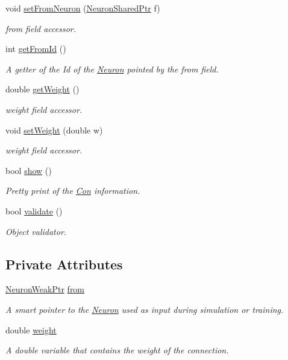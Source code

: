 \begin{DoxyCompactItemize}
void \hyperlink{class_con_a88d665801c38f923b61091f2b4d4c571}{setFromNeuron} (\hyperlink{_a_m_o_r_e_8h_a03051950b0faf9499d14cf376e04c329}{NeuronSharedPtr} f)
\begin{DoxyCompactList}\small\item\em from field accessor. \end{DoxyCompactList}\item 
int \hyperlink{class_con_aad72314592bebdcae6c68a67d2b4a505}{getFromId} ()
\begin{DoxyCompactList}\small\item\em A getter of the Id of the \hyperlink{class_neuron}{Neuron} pointed by the from field. \end{DoxyCompactList}\item 
double \hyperlink{class_con_a385c5bf6eb9e2ffc94c5b427c287ccb2}{getWeight} ()
\begin{DoxyCompactList}\small\item\em weight field accessor. \end{DoxyCompactList}\item 
void \hyperlink{class_con_aa9b30bb7eda5c5578d11a65977968d38}{setWeight} (double w)
\begin{DoxyCompactList}\small\item\em weight field accessor. \end{DoxyCompactList}\item 
bool \hyperlink{class_con_ab85838575b5e01f3b8073136f2102922}{show} ()
\begin{DoxyCompactList}\small\item\em Pretty print of the \hyperlink{class_con}{Con} information. \end{DoxyCompactList}\item 
bool \hyperlink{class_con_af5f836a7b0988b3d9113589b2959d5e6}{validate} ()
\begin{DoxyCompactList}\small\item\em Object validator. \end{DoxyCompactList}\end{DoxyCompactItemize}
\subsection*{Private Attributes}
\begin{DoxyCompactItemize}
\item 
\hyperlink{_a_m_o_r_e_8h_a3e2d414e247d33f77957e70765d161c0}{NeuronWeakPtr} \hyperlink{class_con_a7c05f90dff56fd26c1fa0f042bba67a6}{from}
\begin{DoxyCompactList}\small\item\em A smart pointer to the \hyperlink{class_neuron}{Neuron} used as input during simulation or training. \end{DoxyCompactList}\item 
double \hyperlink{class_con_a7f46485ba5b41971ea38641f9e7d1be0}{weight}
\begin{DoxyCompactList}\small\item\em A double variable that contains the weight of the connection. \end{DoxyCompactList}\end{DoxyCompactItemize}


